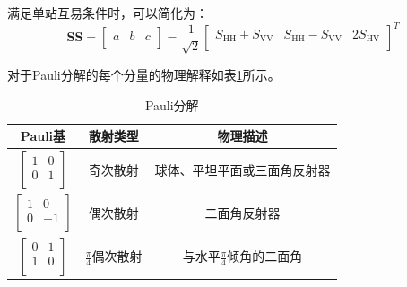 满足单站互易条件时，可以简化为：
\begin{equation}
    \textbf{S}\textbf{S}=\left[ \begin{matrix}
            a & b & c \\
        \end{matrix} \right] =\frac{1}{\sqrt{2}}\left[ \begin{matrix}
            S_{\mathrm{HH}}+S_{\mathrm{VV}} & S_{\mathrm{HH}}-S_{\mathrm{VV}} & 2S_{\mathrm{HV}} \\
        \end{matrix} \right] ^T
\end{equation}

对于Pauli分解的每个分量的物理解释如表\ref{Pauli table}所示。
\begin{table}[ht!]
    \caption{Pauli分解}
    \begin{tabular}{ccc}
        \toprule[1.5bp]
        Pauli基                 & 散射类型                & 物理描述                             \\
        \midrule[0.75bp]
        $\left[ \begin{matrix}
                            1 & 0 \\
                            0 & 1 \\
                        \end{matrix} \right] $ & 奇次散射                & 球体、平坦平面或三面角反射器           \\
        $\left[ \begin{matrix}
                            1 & 0  \\
                            0 & -1 \\
                        \end{matrix} \right] $ & 偶次散射                & 二面角反射器                   \\
        $\left[ \begin{matrix}
                            0 & 1 \\
                            1 & 0 \\
                        \end{matrix} \right] $ & $\frac{\pi}{4}$偶次散射 & 与水平$\frac{\pi}{4}$倾角的二面角 \\
        \bottomrule[1.5bp]
    \end{tabular}
    \label{Pauli table}
\end{table}

